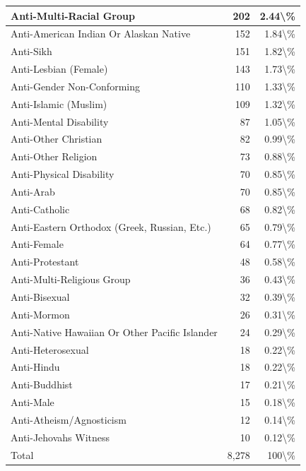\documentclass[
]{krantz}
\begin{document}
\begin{longtable}[t]{l|r|r}
\hline
Anti-Multi-Racial Group & 202 & 2.44\textbackslash{}\%\\
\hline
Anti-American Indian Or Alaskan Native & 152 & 1.84\textbackslash{}\%\\
\hline
Anti-Sikh & 151 & 1.82\textbackslash{}\%\\
\hline
Anti-Lesbian (Female) & 143 & 1.73\textbackslash{}\%\\
\hline
Anti-Gender Non-Conforming & 110 & 1.33\textbackslash{}\%\\
\hline
Anti-Islamic (Muslim) & 109 & 1.32\textbackslash{}\%\\
\hline
Anti-Mental Disability & 87 & 1.05\textbackslash{}\%\\
\hline
Anti-Other Christian & 82 & 0.99\textbackslash{}\%\\
\hline
Anti-Other Religion & 73 & 0.88\textbackslash{}\%\\
\hline
Anti-Physical Disability & 70 & 0.85\textbackslash{}\%\\
\hline
Anti-Arab & 70 & 0.85\textbackslash{}\%\\
\hline
Anti-Catholic & 68 & 0.82\textbackslash{}\%\\
\hline
Anti-Eastern Orthodox (Greek, Russian, Etc.) & 65 & 0.79\textbackslash{}\%\\
\hline
Anti-Female & 64 & 0.77\textbackslash{}\%\\
\hline
Anti-Protestant & 48 & 0.58\textbackslash{}\%\\
\hline
Anti-Multi-Religious Group & 36 & 0.43\textbackslash{}\%\\
\hline
Anti-Bisexual & 32 & 0.39\textbackslash{}\%\\
\hline
Anti-Mormon & 26 & 0.31\textbackslash{}\%\\
\hline
Anti-Native Hawaiian Or Other Pacific Islander & 24 & 0.29\textbackslash{}\%\\
\hline
Anti-Heterosexual & 18 & 0.22\textbackslash{}\%\\
\hline
Anti-Hindu & 18 & 0.22\textbackslash{}\%\\
\hline
Anti-Buddhist & 17 & 0.21\textbackslash{}\%\\
\hline
Anti-Male & 15 & 0.18\textbackslash{}\%\\
\hline
Anti-Atheism/Agnosticism & 12 & 0.14\textbackslash{}\%\\
\hline
Anti-Jehovahs Witness & 10 & 0.12\textbackslash{}\%\\
\hline
Total & 8,278 & 100\textbackslash{}\%\\
\hline
\end{longtable}
\end{document}
